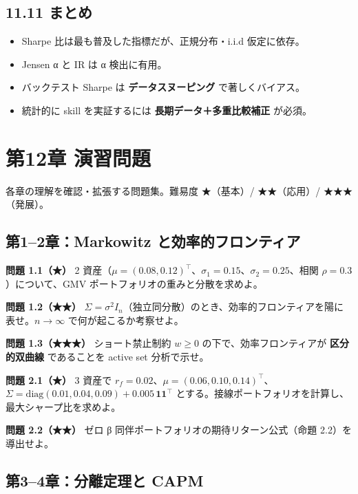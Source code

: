 \documentclass[11pt,a4paper]{report}
\begin{document}
\section{11.11 まとめ}

\begin{itemize}
\item Sharpe 比は最も普及した指標だが、正規分布・i.i.d 仮定に依存。
\item Jensen α と IR は α 検出に有用。
\item バックテスト Sharpe は \textbf{データスヌーピング} で著しくバイアス。
\item 統計的に skill を実証するには \textbf{長期データ＋多重比較補正} が必須。
\end{itemize}

\noindent\hrulefill

\chapter{第12章 演習問題}

各章の理解を確認・拡張する問題集。難易度 ★（基本）/ ★★（応用）/ ★★★（発展）。

\section{第1–2章：Markowitz と効率的フロンティア}

\textbf{問題 1.1（★）} 2 資産（$\mu = (0.08, 0.12)^\top$、$\sigma_1 = 0.15$、$\sigma_2 = 0.25$、相関 $\rho = 0.3$）について、GMV ポートフォリオの重みと分散を求めよ。

\textbf{問題 1.2（★★）} $\Sigma = \sigma^2 I_n$（独立同分散）のとき、効率的フロンティアを陽に表せ。$n \to \infty$ で何が起こるか考察せよ。

\textbf{問題 1.3（★★★）} ショート禁止制約 $w \ge 0$ の下で、効率フロンティアが \textbf{区分的双曲線} であることを active set 分析で示せ。

\textbf{問題 2.1（★）} 3 資産で $r_f = 0.02$、$\mu = (0.06, 0.10, 0.14)^\top$、$\Sigma = \mathrm{diag}(0.01, 0.04, 0.09) + 0.005\, \mathbf{1}\mathbf{1}^\top$ とする。接線ポートフォリオを計算し、最大シャープ比を求めよ。

\textbf{問題 2.2（★★）} ゼロ β 同伴ポートフォリオの期待リターン公式（命題 2.2）を導出せよ。

\section{第3–4章：分離定理と CAPM}
\end{document}
